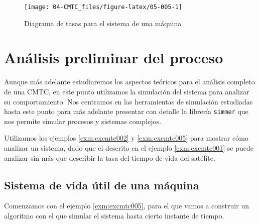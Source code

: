 \documentclass[
]{book}
\theoremstyle{definition}
\theoremstyle{definition}
\theoremstyle{definition}
\theoremstyle{definition}
\theoremstyle{remark}
\begin{document}
\begin{figure}

{\centering \texttt{[image: 04-CMTC\_files/figure-latex/05-005-1]} 

}

\caption{Diagrama de tasas para el sistema de una máquina}\label{fig:05-005}
\end{figure}

\hypertarget{CMTCC}{%
\section{Análisis preliminar del proceso}\label{CMTCC}}

Aunque más adelante estudiaremos los aspectos teóricos para el análisis completo de una CMTC, en este punto utilizamos la simulación del sistema para analizar su comportamiento. Nos centramos en las herramientas de simulación estudiadas hasta este punto para más adelante presentar con detalle la librería \texttt{simmer} que nos permite simular procesos y sistemas complejos.

Utilizamos los ejemplos \ref{exm:excmtc002} y \ref{exm:excmtc005} para mostrar cómo analizar un sistema, dado que el descrito en el ejemplo \ref{exm:excmtc001} se puede analizar sin más que describir la tasa del tiempo de vida del satélite.

\hypertarget{sistema-de-vida-uxfatil-de-una-muxe1quina}{%
\subsection{Sistema de vida útil de una máquina}\label{sistema-de-vida-uxfatil-de-una-muxe1quina}}

Comenzamos con el ejemplo \ref{exm:excmtc005}, para el que vamos a construir un algoritmo con el que simular el sistema hasta cierto instante de tiempo.
\end{document}
